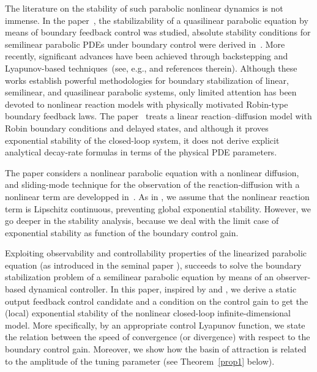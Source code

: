 \documentclass{mpi2015-cscpreprint}
\numberwithin{equation}{section}
\begin{document}
The literature on the stability of such parabolic nonlinear dynamics is not immense. In the paper~\cite{fursikov2001stabilizability}, the stabilizability of a quasilinear parabolic equation by means of boundary feedback control was studied, absolute stability conditions for semilinear parabolic PDEs under boundary control were derived in~\cite{hagen2006absolute}.
More recently, significant advances have been achieved through backstepping and Lyapunov-based techniques~(see, e.g., \cite{karafyllis2019small} and references therein).
Although these works establish powerful methodologies for boundary stabilization of linear, semilinear, and quasilinear parabolic systems, only limited attention has been devoted to nonlinear reaction models with physically motivated Robin-type boundary feedback laws.
The paper~\cite{lhachemi2020boundary} treats a linear reaction–diffusion model with Robin boundary conditions and delayed states, and although it proves exponential stability of the closed-loop system, it does not derive explicit analytical decay-rate formulas in terms of the physical PDE parameters.

The paper \cite{lhachemi2026boundary} considers a nonlinear parabolic equation with a nonlinear diffusion, and sliding-mode technique for the observation of the reaction-diffusion with a nonlinear term are developped in~\cite{mohet2023infinite}. As in \cite{HasWinDoc2020}, we assume that the nonlinear reaction term is Lipschitz continuous, preventing global exponential stability. However, we go deeper in the stability analysis, because we deal with the limit case of exponential stability as function of the boundary control gain.  

Exploiting observability and controllability properties of the linearized parabolic  equation (as introduced in the seminal paper \cite{sakawa1983feedback}), 
\cite{wang2025constructive} succeeds to solve the boundary stabilization problem of a semilinear parabolic equation by means of an observer-based dynamical controller. In this paper, inspired by \cite{lhachemi2025static} and \cite{YevZB2025}, we derive a static output feedback control candidate and a condition on the control gain to get the (local) exponential stability of the nonlinear closed-loop infinite-dimensional model. More specifically, by an appropriate control Lyapunov function, we state the relation between the speed of convergence (or divergence) with respect to the boundary control gain. Moreover, we show how the basin of attraction is related to the amplitude of the tuning parameter (see Theorem~\ref{prop1} below).
\end{document}
